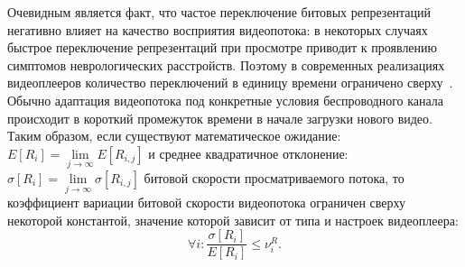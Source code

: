 Очевидным является факт, что частое переключение битовых репрезентаций негативно влияет на качество восприятия видеопотока: в некоторых случаях быстрое переключение репрезентаций при просмотре приводит к проявлению симптомов неврологических расстройств. Поэтому в современных реализациях видеоплееров количество переключений в единицу времени ограничено сверху~\cite{widash}. Обычно адаптация видеопотока под конкретные условия беспроводного канала происходит в короткий промежуток времени в начале загрузки нового видео. Таким образом, если существуют математическое ожидание: $E[R_i] = \lim\limits_{j \rightarrow \infty}E[R_{i,j}]$ и среднее квадратичное отклонение: $\sigma\left[R_{i}\right] = \lim\limits_{j \rightarrow \infty}\sigma\left[R_{i,j}\right] $ битовой скорости просматриваемого потока, то коэффициент вариации битовой скорости видеопотока ограничен сверху некоторой константой, значение которой зависит от типа и настроек видеоплеера:
\begin{equation}
\forall i: \frac{ \sigma\left[R_{i}\right] }{ E\left[R_{i}\right]} \leq \nu^R_i.
\label{eq:SwitchRatio}
\end{equation}

